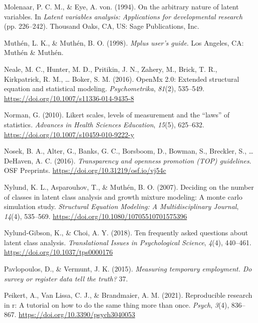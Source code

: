 \documentclass[
  ,man,floatsintext]{apa6}
\newlength{\cslhangindent}
\newlength{\cslentryspacingunit} %
\newenvironment{CSLReferences}[2] %
 {%
  \setlength{\parindent}{0pt}
  \ifodd #1
  \let\oldpar\par
  \def\par{\hangindent=\cslhangindent\oldpar}
  \fi
  \setlength{\parskip}{#2\cslentryspacingunit}
 }%
 {}
\begin{document}
\begin{CSLReferences}{1}{0}
\leavevmode{}%
Molenaar, P. C. M., \& Eye, A. von. (1994). On the arbitrary nature of latent variables. In \emph{Latent variables analysis: Applications for developmental research} (pp. 226--242). Thousand Oaks, {CA}, {US}: Sage Publications, Inc.

\leavevmode{}%
Muthén, L. K., \& Muthén, B. O. (1998). \emph{Mplus user's guide}. Los Angeles, {CA}: Muthén \& Muthén.

\leavevmode{}%
Neale, M. C., Hunter, M. D., Pritikin, J. N., Zahery, M., Brick, T. R., Kirkpatrick, R. M., \ldots{} Boker, S. M. (2016). {OpenMx} 2.0: Extended structural equation and statistical modeling. \emph{Psychometrika}, \emph{81}(2), 535--549. \url{https://doi.org/10.1007/s11336-014-9435-8}

\leavevmode{}%
Norman, G. (2010). Likert scales, levels of measurement and the {``laws''} of statistics. \emph{Advances in Health Sciences Education}, \emph{15}(5), 625--632. \url{https://doi.org/10.1007/s10459-010-9222-y}

\leavevmode{}%
Nosek, B. A., Alter, G., Banks, G. C., Borsboom, D., Bowman, S., Breckler, S., \ldots{} DeHaven, A. C. (2016). \emph{Transparency and openness promotion ({TOP}) guidelines}. {OSF} Preprints. \url{https://doi.org/10.31219/osf.io/vj54c}

\leavevmode{}%
Nylund, K. L., Asparouhov, T., \& Muthén, B. O. (2007). Deciding on the number of classes in latent class analysis and growth mixture modeling: A monte carlo simulation study. \emph{Structural Equation Modeling: A Multidisciplinary Journal}, \emph{14}(4), 535--569. \url{https://doi.org/10.1080/10705510701575396}

\leavevmode{}%
Nylund-Gibson, K., \& Choi, A. Y. (2018). Ten frequently asked questions about latent class analysis. \emph{Translational Issues in Psychological Science}, \emph{4}(4), 440--461. \url{https://doi.org/10.1037/tps0000176}

\leavevmode{}%
Pavlopoulos, D., \& Vermunt, J. K. (2015). \emph{Measuring temporary employment. Do survey or register data tell the truth?} 37.

\leavevmode{}%
Peikert, A., Van Lissa, C. J., \& Brandmaier, A. M. (2021). Reproducible research in r: A tutorial on how to do the same thing more than once. \emph{Psych}, \emph{3}(4), 836--867. \url{https://doi.org/10.3390/psych3040053}


\end{CSLReferences}
\end{document}
